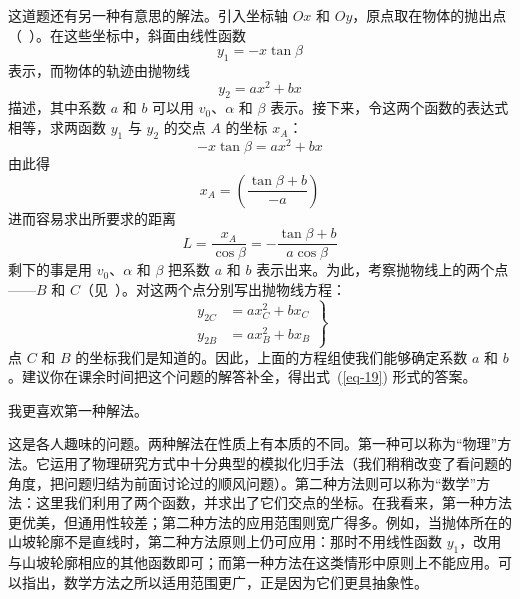 \begin{dialogue}
这道题还有另一种有意思的解法。引入坐标轴 $Ox$ 和 $Oy$，原点取在物体的抛出点（~）。在这些坐标中，斜面由线性函数
\begin{equation*}%
y_{1}=-x \tan \beta
\end{equation*}
表示，而物体的轨迹由抛物线
\begin{equation*}%
y_{2}= ax^{2}+bx
\end{equation*}
描述，其中系数 $a$ 和 $b$ 可以用 $v_{0}$、$\alpha$ 和 $\beta$ 表示。接下来，令这两个函数的表达式相等，求两函数 $y_{1}$ 与 $y_{2}$ 的交点 $A$ 的坐标 $x_{A}$：
\begin{equation*}%
- x \tan \beta = ax^{2} + bx
\end{equation*}
由此得
\begin{equation*}%
x_{A} = \left( \frac{\tan \beta+b}{-a} \right)
\end{equation*}
进而容易求出所要求的距离
\begin{equation}
L= \frac{x_{A}}{\cos \beta } = - \frac{ \tan \beta + b} {a \cos \beta}
\label{eq-20}
\end{equation}
剩下的事是用 $v_{0}$、$\alpha$ 和 $\beta$ 把系数 $a$ 和 $b$ 表示出来。为此，考察抛物线上的两个点——$B$ 和 $C$（见~）。对这两个点分别写出抛物线方程：
\begin{equation*}%
\left.
\begin{aligned}
 y_{2C} &= ax^{2}_{C} + bx_{C} \\
y_{2B} &= ax^{2}_{B} + bx_{B}
\end{aligned}
\right\}
\end{equation*}
点 $C$ 和 $B$ 的坐标我们是知道的。因此，上面的方程组使我们能够确定系数 $a$ 和 $b$。建议你在课余时间把这个问题的解答补全，得出式~(\ref{eq-19}) 形式的答案。

\std 我更喜欢第一种解法。

\tchr 这是各人趣味的问题。两种解法在性质上有本质的不同。第一种可以称为“物理”方法。它运用了物理研究方式中十分典型的模拟化归手法（我们稍稍改变了看问题的角度，把问题归结为前面讨论过的顺风问题）。第二种方法则可以称为“数学”方法：这里我们利用了两个函数，并求出了它们交点的坐标。在我看来，第一种方法更优美，但通用性较差；第二种方法的应用范围则宽广得多。例如，当抛体所在的山坡轮廓不是直线时，第二种方法原则上仍可应用：那时不用线性函数 $y_{1}$，改用与山坡轮廓相应的其他函数即可；而第一种方法在这类情形中原则上不能应用。可以指出，数学方法之所以适用范围更广，正是因为它们更具抽象性。

\end{dialogue}


